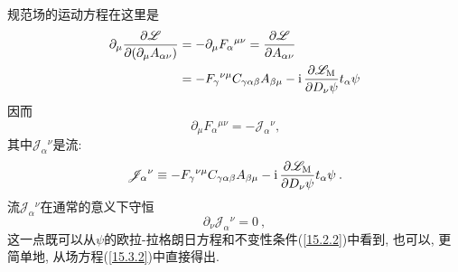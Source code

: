 规范场的运动方程在这里是\begin{align*}
\partial _{\mu }\frac{\partial \mathscr{L}}{\partial (\partial _{\mu
}A_{\alpha \nu })} &=-\partial _{\mu }F_{\alpha }{}^{\mu \nu }=\frac{%
\partial \mathscr{L}}{\partial A_{\alpha \nu }} \\
&=-F_{\gamma }{}^{\nu \mu }C_{\gamma \alpha \beta }A_{\beta \mu }-\mi\,\frac{%
\partial \mathscr{L}_{\mathrm{M}}}{\partial D_{\nu }\psi }t_{\alpha }\psi
\end{align*}%
因而\begin{equation}
\partial _{\mu }F_{\alpha }{}^{\mu \nu }=-\mathscr{J}_{\alpha}{}^{\nu}\text{
,}  \label{15.3.2}
\end{equation}%
其中$\mathscr{J}_{\alpha}{}^{\nu}$是流:%
\begin{equation}
\mathscr{J}_{\alpha}{}^{\nu}\equiv -F_{\gamma }{}^{\nu \mu }C_{\gamma
\alpha \beta }A_{\beta \mu }-\mathrm{i}\,\frac{\partial \mathscr{L}_{\mathrm{M}}}{\partial
D_{\nu }\psi }t_{\alpha }\psi \:.   \label{15.3.3}
\end{equation}%
流$\mathscr{J}_{\alpha}{}^{\nu}$在通常的意义下守恒
\begin{equation}
\partial _{\nu }\mathscr{J}_{\alpha}{}^{\nu}=0\:,   \label{15.3.4}
\end{equation}%
这一点既可以从$\psi $的欧拉-拉格朗日方程和不变性条件(\ref{15.2.2})中看到, 也可以, 更简单地, 从场方程(\ref{15.3.2})中直接得出.


